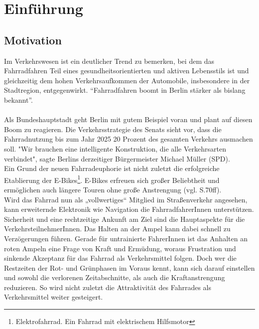 \chapter{\label{chap:einleitung}Einführung}
\section{Motivation}
Im Verkehrswesen ist ein deutlicher Trend zu bemerken, bei dem das Fahrradfahren Teil eines gesundheitsorientierten und aktiven Lebensstils ist und gleichzeitig dem hohen Verkehrsaufkommen der Automobile, insbesondere in der Stadtregion, entgegenwirkt. “Fahrradfahren boomt in Berlin stärker als bislang bekannt”. \cite{Mopo}\\\\
Als Bundeshauptstadt geht Berlin mit gutem Beispiel voran und plant auf diesen Boom zu reagieren. Die Verkehrsstrategie des Senats sieht vor, dass die Fahrradnutzung bis zum Jahr 2025 20 Prozent des gesamten Verkehrs ausmachen soll. "Wir brauchen eine intelligente Konstruktion, die alle Verkehrsarten verbindet", sagte Berlins derzeitiger Bürgermeister Michael Müller (SPD). \cite{Mopo}\\
Ein Grund der neuen Fahrradeuphorie ist nicht zuletzt die erfolgreiche Etablierung der E-Bikes\footnote{ Elektrofahrrad. Ein Fahrrad mit elektrischem Hilfsmotor}. E-Bikes erfreuen sich großer Beliebtheit und ermöglichen auch längere Touren ohne große Anstrengung (vgl. \cite{ebikes} S.70ff).\\ 
Wird das Fahrrad nun als „vollwertiges“ Mitglied im Straßenverkehr angesehen, kann erweiternde Elektronik wie Navigation die FahrradfahrerInnen unterstützen. Sicherheit und eine rechtzeitige Ankunft am Ziel sind die Hauptaspekte für die VerkehrsteilnehmerInnen. Das Halten an der Ampel kann dabei schnell zu Verzögerungen führen. Gerade für untrainierte FahrerInnen ist das Anhalten an roten Ampeln eine Frage von Kraft und Ermüdung, woraus Frustration und sinkende Akzeptanz für das Fahrrad als Verkehrsmittel folgen. Doch wer die Restzeiten der Rot- und Grünphasen im Voraus kennt, kann sich darauf einstellen und sowohl die verlorenen Zeitabschnitte, als auch die Kraftanstrengung reduzieren. So wird nicht zuletzt die Attraktivität des Fahrrades als Verkehrsmittel weiter gesteigert. 
\clearpage
